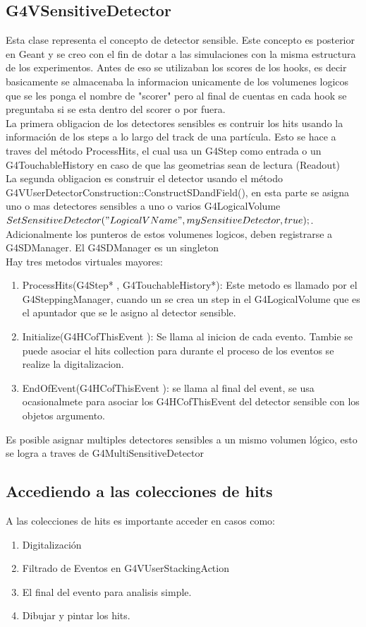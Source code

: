 \documentclass[10pt,a4paper,oneside]{book}
\begin{document}
\subsection*{G4VSensitiveDetector}
Esta clase representa el concepto de detector sensible. Este concepto
es posterior en Geant y se creo con el fin de dotar a las simulaciones
con la misma estructura de los experimentos.  Antes de eso se
utilizaban los scores de los hooks, es decir basicamente se almacenaba
la informacion unicamente de los volumenes logicos que se les ponga el
nombre de "scorer" pero al final de cuentas en cada hook se preguntaba
si se esta dentro del scorer o por fuera.
\\
La primera obligacion de los detectores sensibles es contruir los hits
usando la información de los steps a lo largo del track de una
partícula. Esto se hace a traves del método ProcessHits, el cual usa
un G4Step como entrada o un G4TouchableHistory en caso de que las
geometrias sean de lectura (Readout)
\\
La segunda obligacion es construir el detector usando el método
G4VUserDetectorConstruction::ConstructSDandField(), en esta parte se
asigna uno o mas detectores sensibles a uno o varios G4LogicalVolume
$ SetSensitiveDetector("LogicalV Name", mySensitiveDetector ,
true);$. Adicionalmente los punteros de estos volumenes logicos, deben
registrarse a G4SDManager. El G4SDManager es un singleton
\\
Hay tres metodos virtuales mayores:
\begin{enumerate}
\item ProcessHits(G4Step* , G4TouchableHistory*): Este metodo es llamado por el G4SteppingManager,
  cuando un se crea un step in el G4LogicalVolume que es el apuntador
  que se le asigno al detector sensible.
\item Initialize(G4HCofThisEvent ): Se llama al inicion de cada
  evento. Tambie se puede asociar el hits collection para durante el
  proceso de los eventos se realize la digitalizacion.
\item EndOfEvent(G4HCofThisEvent ): se llama al final del event, se
  usa ocasionalmete para asociar los G4HCofThisEvent del detector
  sensible con los objetos argumento.
\end{enumerate}

Es posible asignar multiples detectores sensibles a un mismo volumen
lógico, esto se logra a traves de G4MultiSensitiveDetector

\subsection*{Accediendo a las colecciones de hits }
A las colecciones de hits es importante acceder en casos como:
\begin{enumerate}
\item Digitalización
\item Filtrado de Eventos en G4VUserStackingAction
\item El final del evento para analisis simple.
\item Dibujar y pintar los hits.
\end{enumerate}
\end{document}
